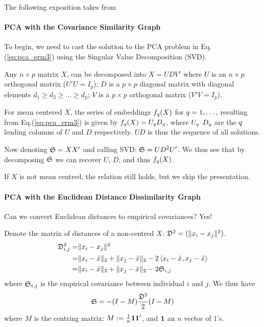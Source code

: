 The following exposition takes from \cite[Section 18.5.2]{hastie_elements_2003}


\paragraph{PCA with the Covariance Similarity Graph}
To begin, we need to cast the solution to the PCA problem in Eq.(\ref{eq:pca_erm3}) using the Singular Value Decomposition (SVD).

\begin{definition}[SVD]
Any $n \times p$ matrix $X$, can be decomposed into $X=UDV'$ where 
$U$ is an $n \times p$ orthogonal matrix ($U'U=I_p$); 
$D$ is a $p \times p$ diagonal matrix with diagonal elements $d_1 \geq d_2 \geq \dots \geq d_p$;
$V$ is a $p \times p$ orthogonal matrix ($V'V=I_p$).
\end{definition}

For mean centered $X$, the series of embeddings $f_q(X)$ for $\rank=1,\dots,\pagebreak$ resulting from Eq.(\ref{eq:pca_erm3}) is given by $f_q(X)=U_q D_q$, where $U_q$ $D_q$ are the $q$ leading columns of $U$ and $D$ respectively. $UD$ is thus the sequence of all solutions.

Now denoting $\mathfrak{S}=XX'$ and calling SVD: $\mathfrak{S}=U D^2 U'$. 
We thus see that by decomposing $\mathfrak{S}$ we can recover $U$, $D$, and thus $f_q(X)$.

If $X$ is not mean centred, the relation still holds, but we skip the presentation.


\paragraph{PCA with the Euclidean Distance Dissimilarity Graph}
Can we convert Euclidean distances to empirical covariances? Yes!

Denote the matrix of distances of a non-centred $X$: $\mathfrak{D}^2=(\Vert x_i-x_j \Vert^2)$.
\begin{align}
	\mathfrak{D}^2_{i,j} =& \Vert x_i-x_j \Vert^2 \\
	=& \Vert x_i-\bar{x} \Vert_2+\Vert x_j-\bar{x} \Vert_2-2 \left< x_i-\bar{x},x_j-\bar{x} \right> \\
	=& \Vert x_i-\bar{x} \Vert_2+\Vert x_j-\bar{x} \Vert_2-2 \mathfrak{S}_{i,j}
\end{align}
where $\mathfrak{S}_{i,j}$ is the empirical covariance between individual $i$ and $j$.
We thus have 
\begin{align}
	\mathfrak{S}= - (I-M) \frac{\mathfrak{D}^2}{2} (I-M)
\end{align}
where $M$ is the centring matrix: $M:= \frac{1}{n} \textbf{1} \textbf{1}'$, and $\textbf{1}$ an $n$ vector of $1$'s.





